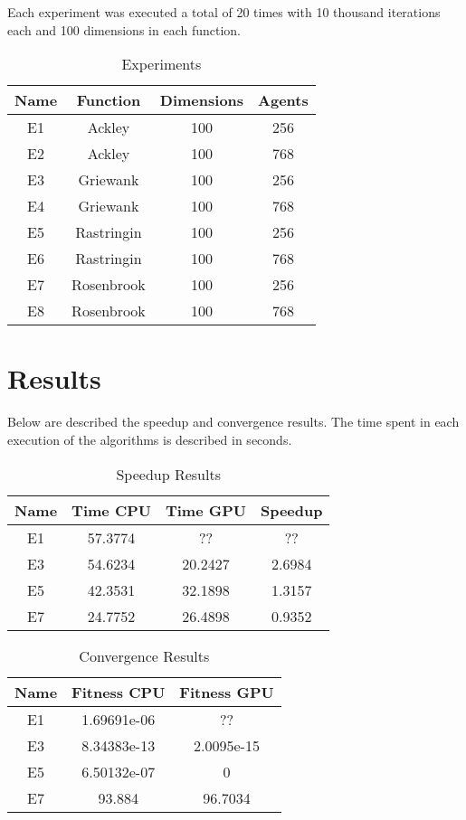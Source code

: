 \documentclass[conference]{IEEEtran}
\begin{document}
Each experiment was executed a total of 20 times with 10 thousand iterations each and 100 dimensions in each function.

\begin{table}[!htbp]
    \renewcommand{\arraystretch}{1.3}
    \caption{Experiments}
    \label{experiments}
    \centering
    \begin{tabular}{c|c|c|c}
    \hline
        \bf Name & Function &  Dimensions & Agents\\
    \hline
        E1 & Ackley & 100 & 256\\
        E2 & Ackley & 100 & 768\\
        E3 & Griewank & 100 & 256\\
        E4 & Griewank & 100 & 768\\
        E5 & Rastringin & 100 & 256\\
        E6 & Rastringin & 100 & 768\\
        E7 & Rosenbrook & 100 & 256\\
        E8 & Rosenbrook & 100 & 768\\
    \end{tabular}
\end{table}

\section{Results}

Below are described the speedup and convergence results. The time spent in each execution of the algorithms is described in seconds.

\begin{table}[!t]
    \renewcommand{\arraystretch}{1.3}
    \caption{Speedup Results}
    \label{results}
    \centering
    \begin{tabular}{c|c|c|c}
    \hline
        \bf Name & Time CPU & Time GPU & Speedup\\
    \hline
        E1 & 57.3774 & ?? & ?? \\
        E3 & 54.6234 & 20.2427 & 2.6984 \\
        E5 & 42.3531 & 32.1898 & 1.3157 \\
        E7 & 24.7752 & 26.4898 & 0.9352 \\
    \end{tabular}
\end{table}

\begin{table}[!t]
    \renewcommand{\arraystretch}{1.3}
    \caption{Convergence Results}
    \label{results}
    \centering
    \begin{tabular}{c|c|c}
    \hline
        \bf Name & Fitness CPU & Fitness GPU \\
    \hline
        E1 & 1.69691e-06 & ?? \\
        E3 & 8.34383e-13 &  2.0095e-15  \\
        E5 & 6.50132e-07 & 0 \\
        E7 & 93.884 & 96.7034 & \\
    \end{tabular}
\end{table}
\end{document}
